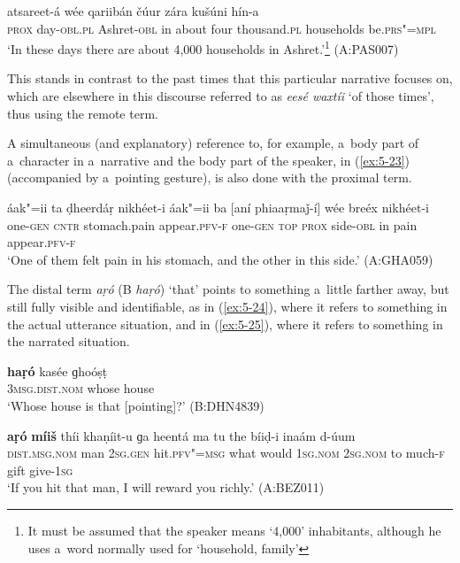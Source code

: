 \begin{exe}
\ex
\label{ex:5-22}
 atsareet-á wée qariibán čúur zára kušúni
hín-a \\
\textsc{prox} day-\textsc{obl.pl} Ashret-\textsc{obl} in about four thousand.\textsc{pl} households
be.\textsc{prs"=mpl} \\
\glt `In these days there are about 4,000 households in Ashret.'\footnote{It must be assumed that the speaker means `4,000' inhabitants, although he uses a~word normally used for `household, family'} (A:PAS007)
\end{exe}
This stands in contrast to the past times that this particular narrative focuses on, which are elsewhere in this discourse referred to as \textit{eesé waxtíi} `of those times', thus using the remote term.

A simultaneous (and explanatory) reference to, for example, a~body part of a~character in a~narrative and the body part of the speaker, in (\ref{ex:5-23}) (accompanied by a~pointing gesture), is also done with the proximal term.


\begin{exe}
\ex
\label{ex:5-23}
\gll áak"=ii ta ḍheerdáṛ nikhéet-i áak"=ii ba [aní phiaaṛmaǰ-í] wée
breéx nikhéet-i \\
one-\textsc{gen} \textsc{cntr} stomach.pain appear.\textsc{pfv-f} one-\textsc{gen} \textsc{top}
\textsc{prox} side-\textsc{obl} in pain appear.\textsc{pfv-f} \\
\glt `One of them felt pain in his stomach, and the other in this side.' (A:GHA059)
\end{exe}
The distal term \textit{aṛó} (B \textit{haṛó}) `that' points to something a~little farther away, but still fully visible and identifiable, as in (\ref{ex:5-24}), where it refers to something in the actual utterance situation, and in (\ref{ex:5-25}), where it refers to something in the narrated situation. 

\begin{exe}
\ex
\label{ex:5-24}
\gll \textbf{haṛó} kasée ɡhoóṣṭ \\
\textsc{3msg.dist.nom} whose house \\
\glt `Whose house is that [pointing]?' (B:DHN4839)

\ex
\label{ex:5-25}
\gll \textbf{aṛó} \textbf{míiš} thíi khaṇíit-u ɡa heentá ma tu the bíiḍ-i inaám d-úum \\
\textsc{dist.msg.nom} man \textsc{2sg.gen} hit.\textsc{pfv"=msg} what would \textsc{1}\textsc{sg.nom} 
\textsc{2sg.nom} to much-\textsc{f} gift give-\textsc{1}\textsc{sg} \\
\glt `If you hit that man, I will reward you richly.' (A:BEZ011)
\end{exe}

